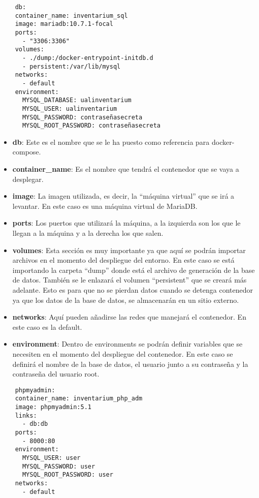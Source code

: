 \begin{verbatim}
    db:
    container_name: inventarium_sql
    image: mariadb:10.7.1-focal
    ports:
      - "3306:3306"
    volumes:
      - ./dump:/docker-entrypoint-initdb.d
      - persistent:/var/lib/mysql
    networks:
      - default
    environment:
      MYSQL_DATABASE: ualinventarium
      MYSQL_USER: ualinventarium
      MYSQL_PASSWORD: contraseñasecreta
      MYSQL_ROOT_PASSWORD: contraseñasecreta
\end{verbatim}
\begin{itemize}
  \item \textbf{db}: Este es el nombre que se le ha puesto como referencia para docker-compose.
  \item \textbf{container\_name}: Es el nombre que tendrá el contenedor que se vaya a desplegar.
  \item \textbf{image}: La imagen utilizada, es decir, la ``máquina virtual'' que se irá a levantar. En este caso es una máquina virtual de MariaDB.
  \item \textbf{ports}: Los puertos que utilizará la máquina, a la izquierda son los que le llegan a la máquina y a la derecha los que salen.
  \item \textbf{volumes}: Esta sección es muy importante ya que aquí se podrán importar archivos en el momento del despliegue del entorno. En este caso se está importando la carpeta ``dump'' donde está el archivo de generación de la base de datos. También se le enlazará el volumen ``persistent'' que se creará más adelante. Esto es para que no se pierdan datos cuando se detenga contenedor ya que los datos de la base de datos, se almacenarán en un sitio externo.
  \item \textbf{networks}: Aquí pueden añadirse las redes que manejará el contenedor. En este caso es la default.
  \item \textbf{environment}: Dentro de environments se podrán definir variables que se necesiten en el momento del despliegue del contenedor. En este caso se definirá el nombre de la base de datos, el usuario junto a su contraseña y la contraseña del usuario root.
\end{itemize}
\begin{verbatim}
    phpmyadmin:
    container_name: inventarium_php_adm
    image: phpmyadmin:5.1
    links:
      - db:db
    ports:
      - 8000:80
    environment:
      MYSQL_USER: user
      MYSQL_PASSWORD: user
      MYSQL_ROOT_PASSWORD: user
    networks:
      - default
\end{verbatim}
